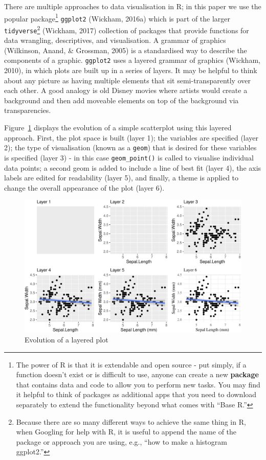 \documentclass[
  english,
  doc,floatsintext]{apa6}
\begin{document}
There are multiple approaches to data visualisation in R; in this paper we use the popular package\footnote{The power of R is that it is extendable and open source - put simply, if a function doesn't exist or is difficult to use, anyone can create a new \textbf{package} that contains data and code to allow you to perform new tasks. You may find it helpful to think of packages as additional apps that you need to download separately to extend the functionality beyond what comes with ``Base R.''} \texttt{ggplot2} (Wickham, 2016a) which is part of the larger \texttt{tidyverse}\footnote{Because there are so many different ways to achieve the same thing in R, when Googling for help with R, it is useful to append the name of the package or approach you are using, e.g., ``how to make a histogram ggplot2.''} (Wickham, 2017) collection of packages that provide functions for data wrangling, descriptives, and visualisation. A grammar of graphics (Wilkinson, Anand, \& Grossman, 2005) is a standardised way to describe the components of a graphic. \texttt{ggplot2} uses a layered grammar of graphics (Wickham, 2010), in which plots are built up in a series of layers. It may be helpful to think about any picture as having multiple elements that sit semi-transparently over each other. A good analogy is old Disney movies where artists would create a background and then add moveable elements on top of the background via transparencies.

Figure~\ref{fig:layers} displays the evolution of a simple scatterplot using this layered approach. First, the plot space is built (layer 1); the variables are specified (layer 2); the type of visualisation (known as a \texttt{geom}) that is desired for these variables is specified (layer 3) - in this case \texttt{geom\_point()} is called to visualise individual data points; a second geom is added to include a line of best fit (layer 4), the axis labels are edited for readability (layer 5), and finally, a theme is applied to change the overall appearance of the plot (layer 6).

\begin{figure}

{\centering \includegraphics[width=1\linewidth]{images/layers-1} 

}

\caption{Evolution of a layered plot}\label{fig:layers}
\end{figure}
\end{document}
